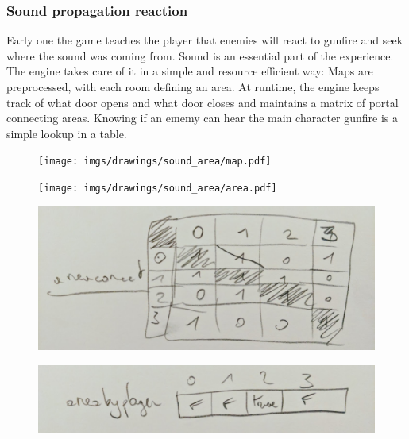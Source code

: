 \subsubsection{Sound propagation reaction}
Early one the game teaches the player that enemies will react to gunfire and seek where the sound was coming from. Sound is an essential part of the experience. The engine takes care of it in a simple and resource efficient way: Maps are preprocessed, with each room defining an area. At runtime, the engine keeps track of what door opens and what door closes and maintains a matrix of portal connecting areas.
Knowing if an ememy can hear the main character gunfire is a simple lookup in a table.

\par
\begin{figure}[H]
 \centering
 \texttt{[image: imgs/drawings/sound\_area/map.pdf]}
\end{figure}
\par

\par
\begin{figure}[H]
 \centering
 \texttt{[image: imgs/drawings/sound\_area/area.pdf]}
\end{figure}
\par


\par
\begin{figure}[H]
 \centering
 \includegraphics[width=\textwidth]{imgs/drawings/soud_propagation/areaconnect.png}
\end{figure}
\par

\par
\begin{figure}[H]
 \centering
 \includegraphics[width=\textwidth]{imgs/drawings/soud_propagation/areabyplayer.png}
\end{figure}
\par









